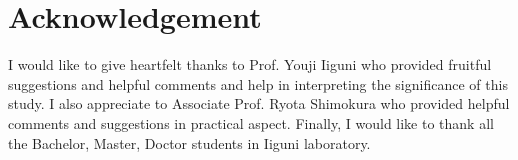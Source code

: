 \chapter*{Acknowledgement}
\label{sec:acknowledgement}
I would like to give heartfelt thanks to Prof. Youji Iiguni who provided fruitful suggestions and helpful comments and help in interpreting the significance of this study. I also appreciate to Associate Prof. Ryota Shimokura who provided helpful comments and suggestions in practical aspect. Finally, I would like to thank all the Bachelor, Master, Doctor students in Iiguni laboratory.